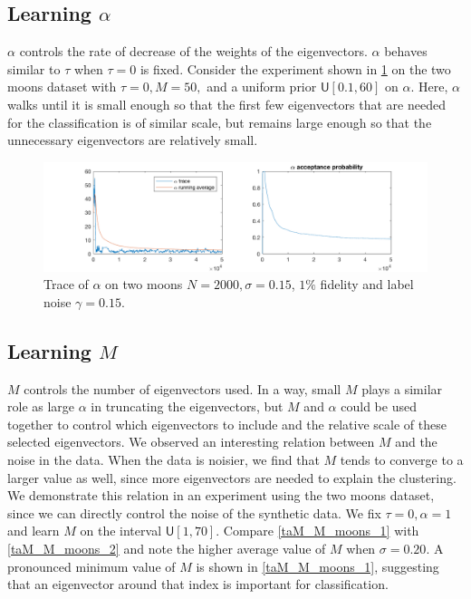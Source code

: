 \documentclass{siamart1116}
\begin{document}
    \subsection{Learning $\alpha$}
        $\alpha$ controls the rate of decrease of the weights of the eigenvectors. $\alpha$ behaves similar to $\tau$ when $\tau = 0$ is fixed. Consider the experiment shown in \cref{taM_alpha_moons} on the two moons dataset with $\tau = 0, M = 50,$ and a uniform prior $\mathsf{U}[0.1,60]$ on $\alpha$. Here, $\alpha$ walks until it is small enough so that the first few eigenvectors that are needed for the classification is of similar scale, but remains large enough so that the unnecessary eigenvectors are relatively small.

        \begin{figure}[!htb]
        \centering
        \caption{\label{taM_alpha_moons}Trace of $\alpha$ on two moons $N=2000, \sigma = 0.15$, $1\%$ fidelity and label noise $\gamma = 0.15$.}
        \includegraphics[width=0.8\linewidth]{alpha_observations/two_moons.png}
        \end{figure}

    \subsection{Learning $M$}
        $M$ controls the number of eigenvectors used. In a way, small $M$ plays a similar role as large $\alpha$ in truncating the eigenvectors, but $M$ and $\alpha$ could be used together to control which eigenvectors to include and the relative scale of these selected eigenvectors. We observed an interesting relation between $M$ and the noise in the data. When the data is noisier, we find that $M$ tends to converge to a larger value as well, since more eigenvectors are needed to explain the clustering. We demonstrate this relation in an experiment using the two moons dataset, since we can directly control the noise of the synthetic data. We fix $\tau=0, \alpha = 1$ and learn $M$ on the interval $\mathsf{U}[1,70]$. Compare \cref{taM_M_moons_1} with \cref{taM_M_moons_2} and note the higher average value of $M$ when $\sigma=0.20$. A pronounced minimum value of $M$ is shown in \cref{taM_M_moons_1}, suggesting that an eigenvector around that index is important for classification.
\end{document}
